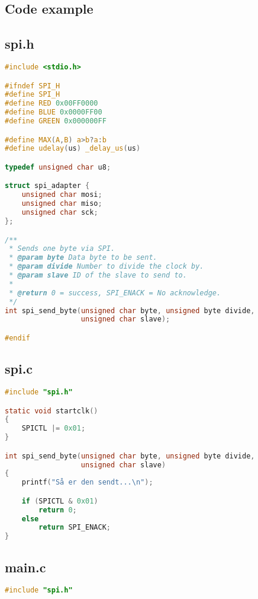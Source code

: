 \documentclass[article, 10pt]{memoir}
\begin{document}
\clearpage
\begin{landscape}
    \begin{multicols}{2}
        \chapter{Code example}
        \section{spi.h}

        \begin{lstlisting}[language=c]
#include <stdio.h>

#ifndef SPI_H
#define SPI_H
#define RED 0x00FF0000
#define BLUE 0x0000FF00
#define GREEN 0x000000FF

#define MAX(A,B) a>b?a:b
#define udelay(us) _delay_us(us)

typedef unsigned char u8;

struct spi_adapter {
    unsigned char mosi;
    unsigned char miso;
    unsigned char sck;
};

/**
 * Sends one byte via SPI.
 * @param byte Data byte to be sent.
 * @param divide Number to divide the clock by.
 * @param slave ID of the slave to send to.
 *
 * @return 0 = success, SPI_ENACK = No acknowledge.
 */
int spi_send_byte(unsigned char byte, unsigned byte divide,
                  unsigned char slave);

#endif
        \end{lstlisting}

        \vfill
        \columnbreak
        \section{spi.c}
        \begin{lstlisting}[language=c]
#include "spi.h"

static void startclk()
{
    SPICTL |= 0x01;
}

int spi_send_byte(unsigned char byte, unsigned byte divide,
                  unsigned char slave)
{
    printf("Så er den sendt...\n");

    if (SPICTL & 0x01)
        return 0;
    else
        return SPI_ENACK;
}
        \end{lstlisting}

        \vfill
        \columnbreak

        \section{main.c}
        \begin{lstlisting}[language=c]
#include "spi.h"


\end{lstlisting}
\end{multicols}
\end{landscape}
\end{document}
